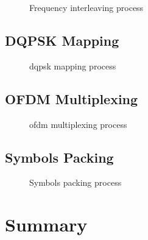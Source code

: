 \documentclass[class=report,11pt,crop=false]{standalone}
\begin{document}
\begin{figure}[htbp]
  \centering
  \captionsetup{type=figure}
  \def\svgwidth{\linewidth}
  { %
  }
  \caption{Frequency interleaving process}
  \label{fig:freq_interleave}
\end{figure}

\subsection{DQPSK Mapping \label{subsect:dab-proc_dqpsk-map}}

\begin{figure}[htbp]
  \centering
  \captionsetup{type=figure}
  \def\svgwidth{\linewidth}
  { %
  }
  \caption{\gls{dqpsk} mapping process}
  \label{fig:dqpsk_map}
\end{figure}

\subsection{OFDM Multiplexing \label{subsect:dab-proc_ofdm-mux}}

\begin{figure}[htbp]
  \centering
  \captionsetup{type=figure}
  \def\svgwidth{\linewidth}
  { %
  }
  \caption{\gls{ofdm} multiplexing process}
  \label{fig:ofdm_mux}
\end{figure}

\subsection{Symbols Packing \label{subsect:dab-proc_symbols-pack}}

\begin{figure}[htbp]
  \centering
  \captionsetup{type=figure}
  \def\svgwidth{\linewidth}
  { %
  }
  \caption{Symbols packing process}
  \label{fig:symbols_pack}
\end{figure}

\section{Summary}

\ifstandalone

\printnoidxglossary[type=\acronymtype,nonumberlist]
\fi
\end{document}
